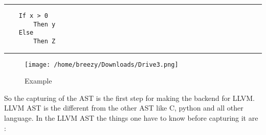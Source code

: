 \documentclass[openany]{book}
\begin{document}
\noindent\rule{12cm}{0.4pt}

\begin{verbatim}
	If x > 0
		Then y
	Else
		Then Z 	
\end{verbatim}

\noindent\rule{12cm}{0.4pt} \newline


\begin{figure}
	\texttt{[image: /home/breezy/Downloads/Drive3.png]}
	\caption{Example}
	\label{fig:3.1}
\end{figure}

So the capturing of the AST is the first step for making the backend for LLVM. LLVM AST is the different from the other AST like C, python and all other language. In the LLVM AST the things one have to know before capturing it are :
\end{document}
